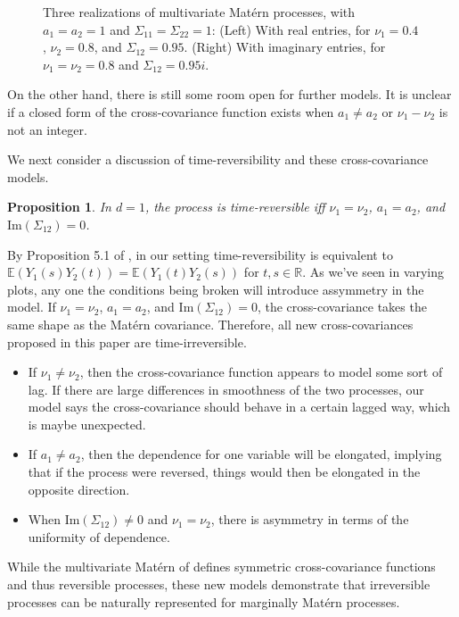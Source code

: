 \documentclass[11pt]{article}
\newtheorem{proposition}{Proposition}[theorem]
\newtheorem*{remark}{Remark}
\begin{document}
\begin{figure}
\caption{Three realizations of multivariate Mat\'ern processes, with $a_1 = a_2 = 1$ and $\Sigma_{11} = \Sigma_{22} = 1$: (Left) With real entries, for $\nu_1 = 0.4$, $\nu_2 = 0.8$, and $\Sigma_{12} = 0.95$. (Right) With imaginary entries, for $\nu_1 = \nu_2 = 0.8$ and $\Sigma_{12} = 0.95i$.}\label{fig:simulation}
\end{figure}



On the other hand, there is still some room open for further models. It is unclear if a closed form of the cross-covariance function exists when $a_1 \neq a_2$ or $\nu_1 - \nu_2$ is not an integer. 


We next consider a discussion of time-reversibility and these cross-covariance models.

\begin{proposition}
In $d=1$, the process is time-reversible iff $\nu_1 = \nu_2$, $a_1 = a_2$, and $\textrm{Im}(\Sigma_{12}) = 0$. 
\end{proposition}

By Proposition 5.1 of \cite{didier_integral_2011}, in our setting time-reversibility is equivalent to $\mathbb{E}(Y_1(s)Y_2(t)) = \mathbb{E}(Y_1(t)Y_2(s))$ for $t, s \in \mathbb{R}$. As we've seen in varying plots, any one the conditions being broken will introduce assymmetry in the model. If $\nu_1 = \nu_2$, $a_1 = a_2$, and $\textrm{Im}(\Sigma_{12}) = 0$, the cross-covariance takes the same shape as the Mat\'ern covariance. Therefore, all new cross-covariances proposed in this paper are time-irreversible. 

\begin{itemize}
\item If $\nu_1 \neq \nu_2$, then the cross-covariance function appears to model some sort of lag. If there are large differences in smoothness of the two processes, our model says the cross-covariance should behave in a certain lagged way, which is maybe unexpected. 

\item If $a_1 \neq a_2$, then the dependence for one variable will be elongated, implying that if the process were reversed, things would then be elongated in the opposite direction.

\item When $\textrm{Im}(\Sigma_{12}) \neq 0$ and $\nu_1=\nu_2$, there is asymmetry in terms of the uniformity of dependence.
\end{itemize}
While the multivariate Mat\'ern of \cite{gneiting_matern_2010} defines symmetric cross-covariance functions and thus reversible processes, these new models demonstrate that irreversible processes can be naturally represented for marginally Mat\'ern processes. 
\end{document}
